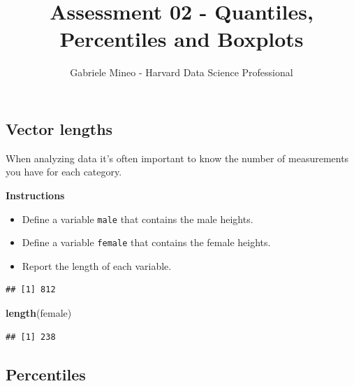 \documentclass[]{article}
\title{Assessment 02 - Quantiles, Percentiles and Boxplots}
\author{Gabriele Mineo - Harvard Data Science Professional}
\date{}
\newenvironment{Shaded}{\begin{snugshade}}{\end{snugshade}}
\newcommand{\KeywordTok}[1]{\textcolor[rgb]{0.13,0.29,0.53}{\textbf{#1}}}
\newcommand{\StringTok}[1]{\textcolor[rgb]{0.31,0.60,0.02}{#1}}
\newcommand{\OperatorTok}[1]{\textcolor[rgb]{0.81,0.36,0.00}{\textbf{#1}}}
\newcommand{\NormalTok}[1]{#1}
\providecommand{\tightlist}{%
  \setlength{\itemsep}{0pt}\setlength{\parskip}{0pt}}
\begin{document}
\maketitle

\subsection{\texorpdfstring{\textbf{Vector
lengths}}{Vector lengths}}\label{vector-lengths}

When analyzing data it's often important to know the number of
measurements you have for each category.

\textbf{Instructions}

\begin{itemize}
\tightlist
\item
  Define a variable \texttt{male} that contains the male heights.
\item
  Define a variable \texttt{female} that contains the female heights.
\item
  Report the length of each variable.
\end{itemize}

\begin{Shaded}
\end{Shaded}

\begin{verbatim}
## [1] 812
\end{verbatim}

\begin{Shaded}
\begin{Highlighting}[]
\KeywordTok{length}\NormalTok{(female)}
\end{Highlighting}
\end{Shaded}

\begin{verbatim}
## [1] 238
\end{verbatim}

\subsection{\texorpdfstring{\textbf{Percentiles}}{Percentiles}}\label{percentiles}
\end{document}
